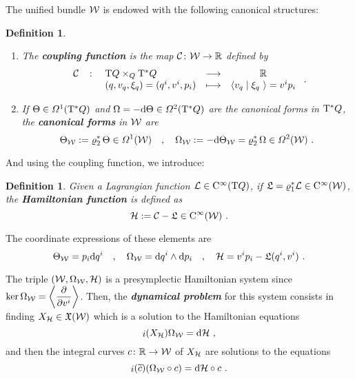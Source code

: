 \documentclass[12pt]{report}
\newtheorem{definition}[teor]{Definition}
\def\ben{\begin{enumerate}}
\def\een{\end{enumerate}}
\def\dst{\displaystyle}
\def\derpar#1#2{\frac{\partial{#1}}{\partial{#2}}}
\def\vf{\mathfrak X}
\def\df{{\mit\Omega}}
\def\Lag{{\cal L}}
\def\d{{\rm d}}
\def\Real{\mathbb{R}}
\def\Tan{{\rm T}}
\def\inn{\mathop{i}\nolimits}
\def\Cinfty{{\rm C}^\infty}
\begin{document}
The unified bundle ${\cal W}$ is endowed with the following canonical structures:

\begin{definition}
\ben
\item
The {\sl \textbf{coupling function}} is the
map ${\cal C}\colon{\cal W}\to\Real$  defined by
$$
\begin{array}{rclcc} 
{\cal C} &\colon& \Tan Q \times_Q\Tan^*Q & \longrightarrow & \Real \\ 
& &(q,v_q,\xi_q)=(q^i,v^i,p_i)& \longmapsto & \langle v_q \mid \xi_q\ \rangle=v^ip_i
 \end{array} \ .
$$
\item
If $\Theta\in\df^1(\Tan^*Q)$ and $\Omega=-\d\Theta\in\df^2(\Tan^*Q)$
are the canonical forms in $\Tan^*Q$,
the \textbf{canonical forms} in ${\cal W}$ are  
$$
\Theta_{\cal W}:=\varrho_2^*\,\Theta\in\df^1({\cal W}) \quad , \quad
\Omega_{\cal W}:=-\d\Theta_{\cal W}=\varrho_2^*\,\Omega\in\df^2({\cal W}) \ .
$$
\een
\end{definition}

And using the coupling function, we introduce:

\begin{definition}
Given a Lagrangian function $\Lag\in\Cinfty(\Tan Q)$, if
${\mathfrak L}=\varrho_1^*\Lag\in\Cinfty({\cal W})$, the \textbf{Hamiltonian function} is defined as
$$
{\cal H}:={\cal C}-{\mathfrak L}\in\Cinfty({\cal W}) \ .
$$
\end{definition}

The coordinate expressions of these elements are
$$
\Theta_{\cal W}=p_i\d q^i \quad , \quad
\Omega_{\cal W}=\d q^i\wedge\d p_i\quad , \quad
{\cal H}=v^ip_i-{\mathfrak L}(q^i,v^i) \ .
$$

The triple $({\cal W},\Omega_{\cal W},{\cal H})$
is a presymplectic Hamiltonian system since
$\dst\ker\Omega_{\cal W}=\left\langle\derpar{}{v^i}\right\rangle$.
Then, the {\sl\textbf{dynamical problem}} for this system consists in finding $X_{\cal H}\in\vf({\cal W})$
which is a solution to the Hamiltonian equations
\begin{equation}
\label{Whamilton-contact-eqs0}
\inn(X_{\cal H})\Omega_{\cal W}=\d{\cal H} \ ,
\end{equation}
and then the integral curves $c\colon\Real\to{\cal W}$
 of $X_{\cal H}$ are solutions to the equations
\begin{equation}
\label{Whamilton-contact-eqs0b}
\inn(\widetilde c)(\Omega_{\cal W}\circ c)=\d{\cal H}\circ c \ .
\end{equation}
\end{document}
